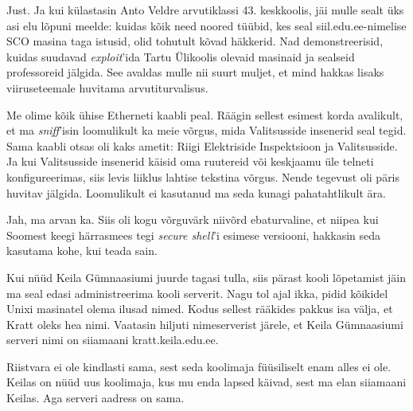 
Just. Ja kui külastasin Anto 
Veldre arvutiklassi 43. 
keskkoolis, jäi mulle sealt üks asi elu 
lõpuni meelde: kuidas kõik need noored tüübid, kes seal 
siil.edu.ee-nimelise SCO masina 
taga istusid, olid tohutult kõvad häkkerid. Nad demonstreerisid,
kuidas suudavad \emph{exploit}'ida Tartu 
Ülikoolis olevaid masinaid\label{sisu!ylikooli_root} ja sealseid professoreid jälgida. See 
avaldas mulle nii suurt muljet, et mind hakkas lisaks 
viiruseteemale huvitama arvutiturvalisus.

Me olime kõik ühise Etherneti kaabli peal. Räägin sellest esimest korda avalikult, et ma 
\emph{sniff}'isin loomulikult ka meie võrgus, mida 
Valitsusside insenerid seal tegid. Sama kaabli otsas oli kaks ametit: Riigi Elektriside 
Inspektsioon ja 
Valitsusside. Ja kui Valitsusside insenerid käisid oma ruutereid või 
keskjaamu üle telneti konfigureerimas, siis levis liiklus lahtise 
tekstina võrgus. Nende tegevust oli päris huvitav jälgida. 
Loomulikult ei kasutanud ma seda kunagi pahatahtlikult ära.


Jah, ma arvan ka. Siis oli kogu võrguvärk 
niivõrd ebaturvaline, et niipea kui Soomest keegi härrasmees tegi 
\emph{secure shell}'i esimese versiooni, hakkasin seda kasutama kohe, kui teada sain. 

Kui nüüd Keila Gümnaasiumi juurde tagasi tulla, siis 
pärast kooli lõpetamist jäin ma seal edasi 
administreerima kooli serverit. Nagu tol ajal ikka, pidid 
kõikidel Unixi masinatel olema ilusad nimed. Kodus sellest rääkides pakkus 
isa välja, et Kratt oleks hea nimi. 
Vaatasin hiljuti nimeserverist järele, et Keila Gümnaasiumi serveri 
nimi on siiamaani kratt.keila.edu.ee.


Riistvara ei ole kindlasti sama, sest seda koolimaja füüsiliselt enam alles 
ei ole. Keilas on nüüd uus koolimaja, kus mu enda lapsed käivad, sest ma elan 
siiamaani Keilas. Aga serveri aadress on sama.

